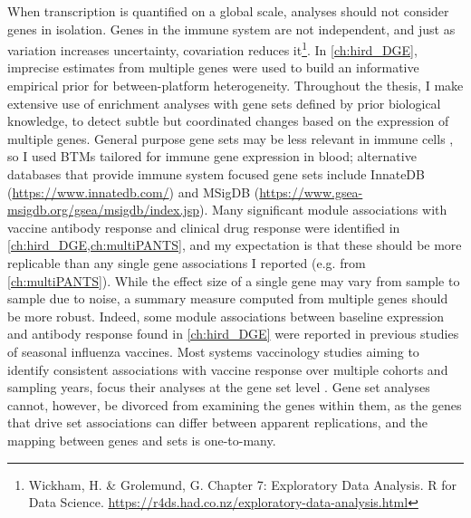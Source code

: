 
When transcription is quantified on a global scale, analyses should not consider genes in isolation.
Genes in the immune system are not independent, and just as variation increases uncertainty, covariation reduces it\footnote{Wickham, H. \& Grolemund, G. Chapter 7: Exploratory Data Analysis. R for Data Science. \url{https://r4ds.had.co.nz/exploratory-data-analysis.html}}.
In \cref{ch:hird_DGE}, imprecise estimates from multiple genes were used to build an informative empirical prior for between-platform heterogeneity.
Throughout the thesis, I make extensive use of enrichment analyses with gene sets defined by prior biological knowledge,
to detect subtle but coordinated changes based on the expression of multiple genes.
General purpose gene sets may be less relevant in immune cells \autocite{nakaya2015SystemsAnalysisImmunity}, 
so I used \glspl{BTM} \autocite{chaussabel2008ModularAnalysisFramework,li2013MolecularSignaturesAntibody} tailored for immune gene expression in blood;
alternative databases that provide immune system focused gene sets include InnateDB (\url{https://www.innatedb.com/}) and MSigDB (\url{https://www.gsea-msigdb.org/gsea/msigdb/index.jsp}).
Many significant module associations with vaccine antibody response and clinical drug response were identified in \cref{ch:hird_DGE,ch:multiPANTS},
and my expectation is that these should be more replicable than any single gene associations I reported (e.g.  from \cref{ch:multiPANTS}).
While the effect size of a single gene may vary from sample to sample due to noise, 
a summary measure computed from multiple genes should be more robust.
Indeed, some module associations between baseline expression and antibody response found in \cref{ch:hird_DGE} were reported in previous studies of seasonal influenza vaccines.
Most systems vaccinology studies aiming to identify consistent associations with vaccine response over multiple cohorts and sampling years,
focus their analyses at the gene set level \autocite{tsang2020ImprovingVaccineinducedImmunity}.
Gene set analyses cannot, however, be divorced from examining the genes within them,
as the genes that drive set associations can differ between apparent replications,
and the mapping between genes and sets is one-to-many.

